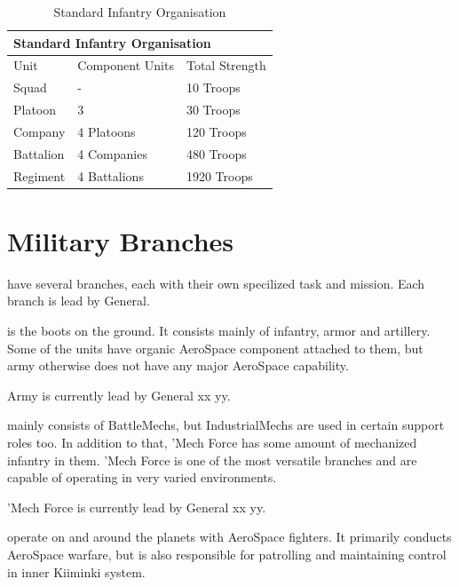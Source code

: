 \documentclass{tufte-book}
\begin{document}
\bigskip
\begin{table}
\begin{minipage}{\textwidth}
\begin{center}
\begin{tabular}{lll}
\toprule
\multicolumn{3}{l}{Standard Infantry Organisation} \\
\midrule
Unit & Component Units & Total Strength \\
\midrule
Squad     & -            & 10 Troops \\
Platoon   & 3            & 30 Troops \\
Company   & 4 Platoons   & 120 Troops \\
Battalion & 4 Companies  & 480 Troops \\
Regiment  & 4 Battalions & 1920 Troops \\
\bottomrule
\end{tabular}
\end{center}
\end{minipage}
\caption{Standard Infantry Organisation}
\end{table}

\section{Military Branches}
\label{sc:military_branches}

 have several branches, each with their own
specilized task and mission. Each branch is lead by General.

 is the boots on the ground. It consists mainly of infantry,
armor and artillery. Some of the units have organic AeroSpace component
attached to them, but army otherwise does not have any major AeroSpace
capability.

Army is currently lead by General xx yy.

 mainly consists of BattleMechs, but IndustrialMechs
are used in certain support roles too. In addition to that, 'Mech Force has
some amount of mechanized infantry in them. 'Mech Force is one of the most
versatile branches and are capable of operating in very varied environments.

'Mech Force is currently lead by General xx yy.

 operate on and around the planets with AeroSpace
fighters. It primarily conducts AeroSpace warfare, but is also responsible for
patrolling and maintaining control in inner Kiiminki system.
\end{document}
